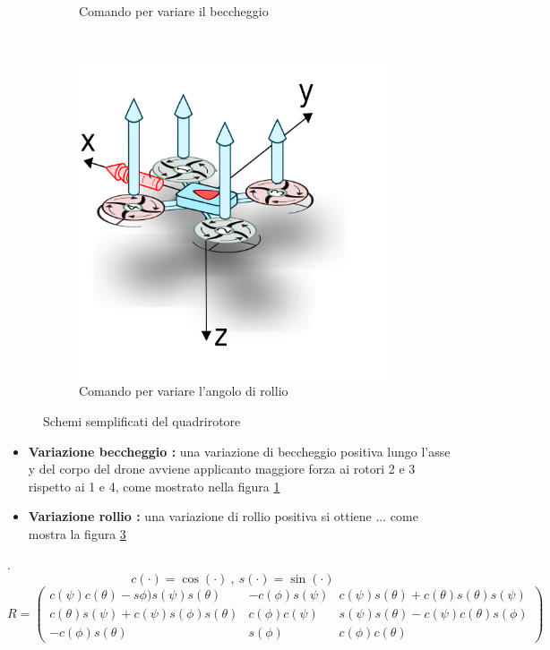 \begin{figure}
\begin{subfigure}{0.45\textwidth}
		\caption{Comando per variare il beccheggio}
		\label{fig:modello_quad_pitch}
	\end{subfigure}
	\\
	\begin{subfigure}{0.45\textwidth}
		\centering
		\includegraphics[width=1\textwidth]{SistemaQuadrirotore/Figure/drone_roll}
		\caption{Comando per variare l'angolo di rollio}
		\label{fig:modello_quad_roll}
	\end{subfigure}
	\caption{Schemi semplificati del quadrirotore}
\end{figure}
\begin{itemize}
	\item \textbf{Variazione beccheggio : } una variazione di beccheggio positiva lungo l'asse y del corpo del drone avviene applicanto maggiore forza ai rotori 2 e 3 rispetto ai 1 e 4, come mostrato nella figura \ref{fig:modello_quad_pitch}
	\item \textbf{Variazione rollio :} una variazione di rollio positiva si ottiene ... come mostra la figura \ref{fig:modello_quad_roll}
\end{itemize}
\cite{DesTestCarm}.
\[ 	c(\cdot)=\cos(\cdot)\ ,\  s(\cdot) = \sin(\cdot) \]
\begin{equation}
R=
	\begin{pmatrix}
	c(\psi)c(\theta)-s\phi)s(\psi)s(\theta) & -c(\phi)s(\psi) & c(\psi)s(\theta)+c(\theta)s(\theta)s(\psi) \\ 
	c(\theta) s(\psi)+c(\psi)s(\phi)s(\theta) & c(\phi)c(\psi) & s(\psi)s(\theta)-c(\psi)c(\theta)s(\phi) \\ 
	-c(\phi)s(\theta)	& s(\phi) & c(\phi)c(\theta)
	\end{pmatrix}
\end{equation}

